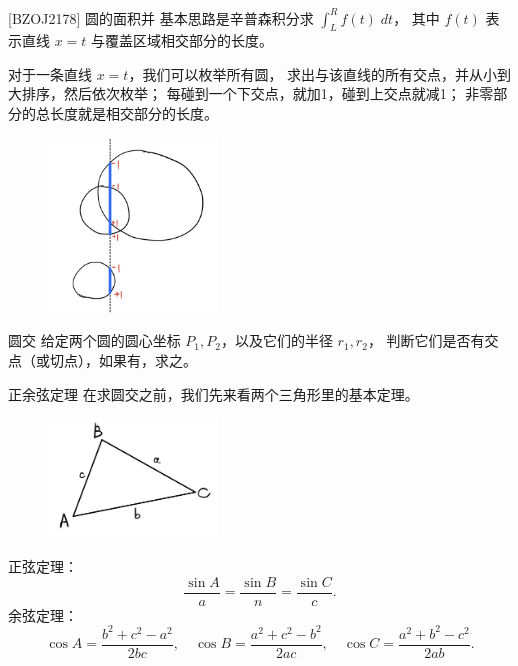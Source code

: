 \documentclass{beamer}
\begin{document}
\begin{frame}{[BZOJ2178] 圆的面积并}
    \footnotesize
    基本思路是辛普森积分求 $\int_L^R f(t)\; dt$，
    其中 $f(t)$ 表示直线 $x=t$ 与覆盖区域相交部分的长度。
    
    \vspace{1em}\pause
    对于一条直线 $x=t$，我们可以枚举所有圆，
    求出与该直线的所有交点，并从小到大排序，然后依次枚举；
    每碰到一个下交点，就加1，碰到上交点就减1；
    非零部分的总长度就是相交部分的长度。

    \begin{figure}[H]
        \centering
        \includegraphics[width=0.4\textwidth]{pic/circleinsec.jpg}
    \end{figure}
\end{frame}

\begin{frame}{圆交}
    \small
    给定两个圆的圆心坐标 $P_1,P_2$，以及它们的半径 $r_1,r_2$，
    判断它们是否有交点（或切点），如果有，求之。
\end{frame}

\begin{frame}{正余弦定理}
    \small
    在求圆交之前，我们先来看两个三角形里的基本定理。

    \vspace{1em}\pause
    \begin{figure}[H]
        \centering
        \includegraphics[width=0.4\textwidth]{pic/triangle.jpg}
    \end{figure}
    正弦定理：
    \begin{equation}
        \frac{\sin A}{a}=\frac{\sin B}{n}=\frac{\sin C}{c}.
    \end{equation}
    余弦定理：
    \begin{equation}
        \cos A=\frac{b^2+c^2-a^2}{2bc},\quad
        \cos B=\frac{a^2+c^2-b^2}{2ac},\quad
        \cos C=\frac{a^2+b^2-c^2}{2ab}. 
    \end{equation}
\end{frame}
\end{document}
